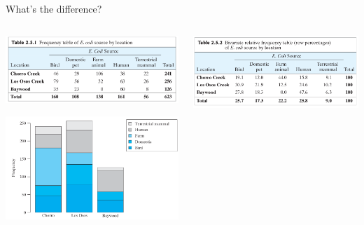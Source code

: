 \begin{frame}{What's the difference?}

    \begin{columns}
        \begin{column}{0.5\textwidth}
    \begin{center}
            \includegraphics[width=.9\textwidth]{ecoli-counts-tab2_5_1.png}

            \includegraphics[width=.9\textwidth]{ecoli-counts-fig2_5_1.png}
    \end{center}
        \end{column}

        \begin{column}{0.5\textwidth}

    \begin{center}
            \includegraphics[width=.9\textwidth]{ecoli-freqs-tab2_5_2.png}


\end{center}
\end{column}
\end{columns}
\end{frame}
